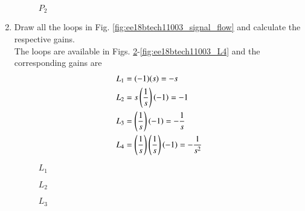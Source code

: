\begin{enumerate}[label=\thesubsection.\arabic*.,ref=\thesubsection.\theenumi]
\begin{figure}[!ht]
\begin{center}
		\resizebox{\columnwidth}{!}{}
	\end{center}
\caption{$P_2$}
\label{fig:ee18btech11003_P2}
\end{figure}
\renewcommand{\thefigure}{\theenumi}
%
\item Draw all the loops in Fig. \ref{fig:ee18btech11003_signal_flow} and calculate the respective gains.
\renewcommand{\thefigure}{\theenumi.\arabic{figure}}
\\
\solution The loops are available in Figs. \ref{fig:ee18btech11003_L1}-\ref{fig:ee18btech11003_L4}
and the corresponding gains are
%
\begin{align}
L_1&=(-1)(s)=-s
\\
L_2&=s\left(\frac{1}{s}\right)\left(-1\right)=-1
\\
L_3&=\left(\frac{1}{s}\right)(-1)=-\frac{1}{s}
\\
L_4&=\left(\frac{1}{s}\right)\left(\frac{1}{s}\right)(-1)=-\frac{1}{s^2}
\end{align}

\begin{figure}[!ht]
\begin{center}
		
		\resizebox{\columnwidth}{!}{}
	\end{center}
\caption{$L_1$}
\label{fig:ee18btech11003_L1}
\end{figure}



\begin{figure}[!ht]
\begin{center}
		
		\resizebox{\columnwidth}{!}{}
	\end{center}
\caption{$L_2$}
\label{fig:ee18btech11003_L2}
\end{figure}



\begin{figure}[!ht]
\begin{center}
		
		\resizebox{\columnwidth}{!}{}
	\end{center}
\caption{$L_3$}
\label{fig:ee18btech11003_L3}
\end{figure}



\begin{figure}[!ht]
\begin{center}
		

\end{center}
\end{figure}
\end{enumerate}
